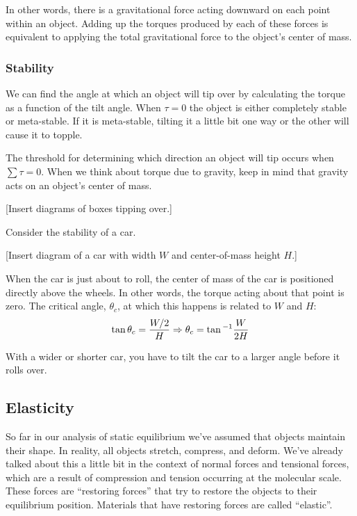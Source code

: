 In other words, there is a gravitational force acting downward on each point within an object. Adding up the torques produced by each of these forces is equivalent to applying the total gravitational force to the object's center of mass.

\subsubsection*{Stability}
We can find the angle at which an object will tip over by calculating the torque as a function of the tilt angle. When $\tau=0$ the object is either completely stable or meta-stable. If it is meta-stable, tilting it a little bit one way or the other will cause it to topple.

The threshold for determining which direction an object will tip occurs when $\sum \tau =0$. When we think about torque due to gravity, keep in mind that gravity acts on an object's center of mass. 

[Insert diagrams of boxes tipping over.]
\vspace{5cm}

Consider the stability of a car.

[Insert diagram of a car with width $W$ and center-of-mass height $H$.]
\vspace{5cm}

When the car is just about to roll, the center of mass of the car is positioned directly above the wheels. In other words, the torque acting about that point is zero. The critical angle, $\theta_c$, at which this happens is related to $W$ and $H$:
$$\tan\theta_c=\frac{W/2}{H}\Rightarrow \theta_c=\tan\displaystyle^{-1}\frac{W}{2H}$$

With a wider or shorter car, you have to tilt the car to a larger angle before it rolls over.


\subsection{Elasticity}
So far in our analysis of static equilibrium we've assumed that objects maintain their shape. In reality, all objects stretch, compress, and deform. We've already talked about this a little bit in the context of normal forces and tensional forces, which are a result of compression and tension occurring at the molecular scale. These forces are ``restoring forces'' that try to restore the objects to their equilibrium position. Materials that have restoring forces are called ``elastic''. 


